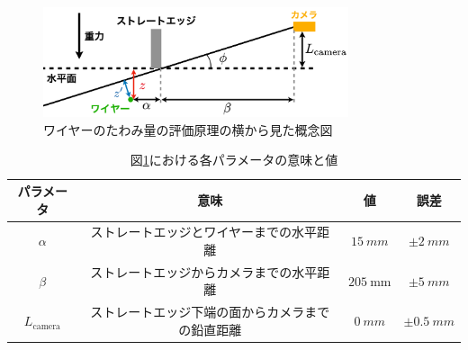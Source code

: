 \documentclass[../../main.tex]{subfiles}
\begin{document}
\begin{figure}[H]
    \centering
    \includegraphics[width=0.8\textwidth]{wiresag/wiresag_concept_yoko.pdf}
    \caption{ワイヤーのたわみ量の評価原理の横から見た概念図}
    \label{fig:wiresag_concept_yoko}
\end{figure}
\begin{table}[H]
    \centering
    \caption{図\ref{fig:wiresag_concept_yoko}における各パラメータの意味と値}
    \begin{tabular}{cccc}
        \hline
        パラメータ & 意味 & 値 & 誤差 \\
        \hline\hline
        $\alpha$ & ストレートエッジとワイヤーまでの水平距離 & $\SI{15}{mm}$ & $\pm\SI{2}{mm}$ \\
        $\beta$ & ストレートエッジからカメラまでの水平距離 & $\SI{205}{\mm}$ & $\pm\SI{5}{mm}$ \\
        $L_{\mathrm{camera}}$ & ストレートエッジ下端の面からカメラまでの鉛直距離 & $\SI{0}{mm}$ & $\pm\SI{0.5}{mm}$ \\
        \hline
    \end{tabular}
    \label{tab:wiresag_concept_yoko_params}
\end{table}
\end{document}

